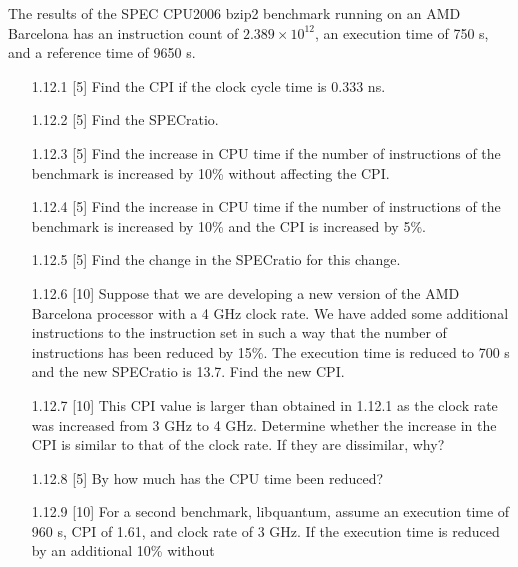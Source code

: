 \noindent The results of the SPEC CPU2006 bzip2 benchmark running on an AMD Barcelona
has an instruction count of $2.389 \times 10^{12}$, an execution time of
750 s, and a reference time of 9650 s.

\begin{enumerate}
  \item[1.12.1] [5] Find the CPI if the clock cycle time is 0.333 ns.
  \item[1.12.2] [5] Find the SPECratio.
  \item[1.12.3] [5] Find the increase in CPU time if the number of
        instructions of the benchmark is increased by 10\% without
        affecting the CPI.
  \item[1.12.4] [5] Find the increase in CPU time if the number of
        instructions of the benchmark is increased by 10\% and the CPI
        is increased by 5\%.
  \item[1.12.5] [5] Find the change in the SPECratio for this change.
  \item[1.12.6] [10] Suppose that we are developing a new version of the
        AMD Barcelona processor with a 4 GHz clock rate. We have added some
        additional instructions to the instruction set in such a way that the
        number of instructions has been reduced by 15\%. The execution time
        is reduced to 700 s and the new SPECratio is 13.7. Find the new CPI.
  \item[1.12.7] [10] This CPI value is larger than obtained in 1.12.1 as
        the clock rate was increased from 3 GHz to 4 GHz. Determine whether
        the increase in the CPI is similar to that of the clock rate. If
        they are dissimilar, why?
  \item[1.12.8] [5] By how much has the CPU time been reduced?
  \item[1.12.9] [10] For a second benchmark, libquantum, assume an
        execution time of 960 s, CPI of 1.61, and clock rate of 3 GHz.
        If the execution time is reduced by an additional 10\% without

\end{enumerate}
